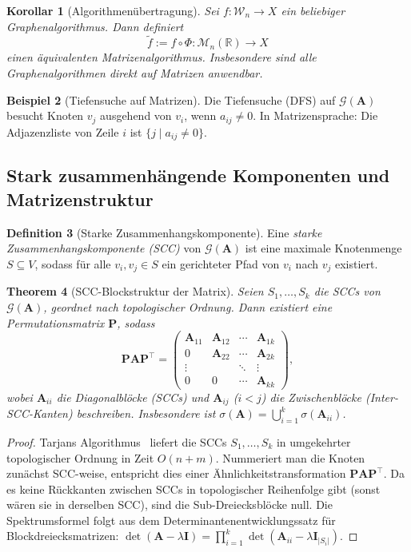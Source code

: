 ﻿\documentclass[12pt, a4paper]{article}
\newtheorem{theorem}{Theorem}[section]
\newtheorem{corollary}[theorem]{Korollar}
\theoremstyle{definition}
\newtheorem{definition}[theorem]{Definition}
\newtheorem{example}[theorem]{Beispiel}
\theoremstyle{remark}
\newcommand{\R}{\mathbb{R}}
\newcommand{\vA}{\bm{A}}
\newcommand{\vP}{\bm{P}}
\newcommand{\vI}{\bm{I}}
\newcommand{\T}{\top}
\newcommand{\spec}{\sigma}
\begin{document}
\begin{corollary}[Algorithmenübertragung]
\label{cor:algo}
Sei $f: \mathcal{W}_n \to X$ ein beliebiger Graphenalgorithmus. Dann
definiert
\[
  \tilde{f} := f \circ \Phi: \mathcal{M}_n(\R) \to X
\]
einen äquivalenten Matrizenalgorithmus. Insbesondere sind alle
Graphenalgorithmen direkt auf Matrizen anwendbar.
\end{corollary}

\begin{example}[Tiefensuche auf Matrizen]
Die Tiefensuche (DFS) auf $\mathcal{G}(\vA)$ besucht Knoten $v_j$
ausgehend von $v_i$, wenn $a_{ij} \neq 0$. In Matrizensprache:
Die Adjazenzliste von Zeile $i$ ist $\{j \mid a_{ij} \neq 0\}$.
\end{example}

\subsection{Stark zusammenhängende Komponenten und Matrizenstruktur}
\label{subsec:scc}

\begin{definition}[Starke Zusammenhangskomponente]
Eine \emph{starke Zusammenhangskomponente (SCC)} von $\mathcal{G}(\vA)$
ist eine maximale Knotenmenge $S \subseteq V$, sodass für alle
$v_i, v_j \in S$ ein gerichteter Pfad von $v_i$ nach $v_j$ existiert.
\end{definition}

\begin{theorem}[SCC-Blockstruktur der Matrix]
\label{thm:scc_block}
Seien $S_1, \ldots, S_k$ die SCCs von $\mathcal{G}(\vA)$, geordnet nach
topologischer Ordnung. Dann existiert eine Permutationsmatrix $\vP$, sodass
\[
  \vP \vA \vP^\T =
  \begin{pmatrix}
    \vA_{11} & \vA_{12} & \cdots & \vA_{1k} \\
    0        & \vA_{22} & \cdots & \vA_{2k} \\
    \vdots   &          & \ddots & \vdots   \\
    0        & 0        & \cdots & \vA_{kk}
  \end{pmatrix},
\]
wobei $\vA_{ii}$ die Diagonalblöcke (SCCs) und $\vA_{ij}$ ($i < j$)
die Zwischenblöcke (Inter-SCC-Kanten) beschreiben. Insbesondere ist
$\spec(\vA) = \bigcup_{i=1}^k \spec(\vA_{ii})$.
\end{theorem}

\begin{proof}
Tarjans Algorithmus~\citep{tarjan1972} liefert die SCCs $S_1,\ldots,S_k$
in umgekehrter topologischer Ordnung in Zeit $O(n+m)$. Nummeriert man
die Knoten zunächst SCC-weise, entspricht dies einer Ähnlichkeitstransformation
$\vP \vA \vP^\T$. Da es keine Rückkanten zwischen SCCs in topologischer
Reihenfolge gibt (sonst wären sie in derselben SCC), sind die
Sub-Dreiecksblöcke null. Die Spektrumsformel folgt aus dem
Determinantenentwicklungssatz für Blockdreiecksmatrizen:
$\det(\vA - \lambda \vI) = \prod_{i=1}^k \det(\vA_{ii} - \lambda \vI_{|S_i|})$.
\end{proof}
\end{document}
